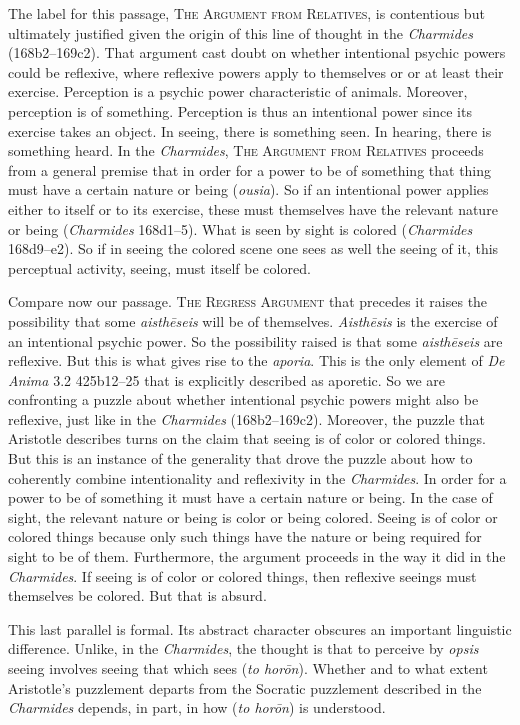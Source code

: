 The label for this passage, \textsc{The Argument from Relatives}, is contentious but ultimately justified given the origin of this line of thought in the \emph{Charmides} (168b2–169c2). That argument cast doubt on whether intentional psychic powers could be reflexive, where reflexive powers apply to themselves or or at least their exercise. Perception is a psychic power characteristic of animals. Moreover, perception is of something. Perception is thus an intentional power since its exercise takes an object. In seeing, there is something seen. In hearing, there is something heard. In the \emph{Charmides}, \textsc{The Argument from Relatives} proceeds from a general premise that in order for a power to be of something that thing must have a certain nature or being (\emph{ousia}). So if an intentional power applies either to itself or to its exercise, these must themselves have the relevant nature or being (\emph{Charmides} 168d1–5). What is seen by sight is colored (\emph{Charmides} 168d9–e2). So if in seeing the colored scene one sees as well the seeing of it, this perceptual activity, seeing, must itself be colored.

Compare now our passage. \textsc{The Regress Argument} that precedes it raises the possibility that some \emph{aisthēseis} will be of themselves. \emph{Aisthēsis} is the exercise of an intentional psychic power. So the possibility raised is that some \emph{aisthēseis} are reflexive. But this is what gives rise to the \emph{aporia}. This is the only element of \emph{De Anima} 3.2 425b12–25 that is explicitly described as aporetic. So we are confronting a puzzle about whether intentional psychic powers might also be reflexive, just like in the \emph{Charmides} (168b2–169c2). Moreover, the puzzle that Aristotle describes turns on the claim that seeing is of color or colored things. But this is an instance of the generality that drove the puzzle about how to coherently combine intentionality and reflexivity in the \emph{Charmides}. In order for a power to be of something it must have a certain nature or being. In the case of sight, the relevant nature or being is color or being colored. Seeing is of color or colored things because only such things have the nature or being required for sight to be of them. Furthermore, the argument proceeds in the way it did in the \emph{Charmides}. If seeing is of color or colored things, then reflexive seeings must themselves be colored. But that is absurd.

This last parallel is formal. Its abstract character obscures an important linguistic difference. Unlike, in the \emph{Charmides}, the thought is that to perceive by \emph{opsis} seeing involves seeing that which sees (\emph{to horōn}). Whether and to what extent Aristotle's puzzlement departs from the Socratic puzzlement described in the \emph{Charmides} depends, in part, in how (\emph{to horōn}) is understood.

